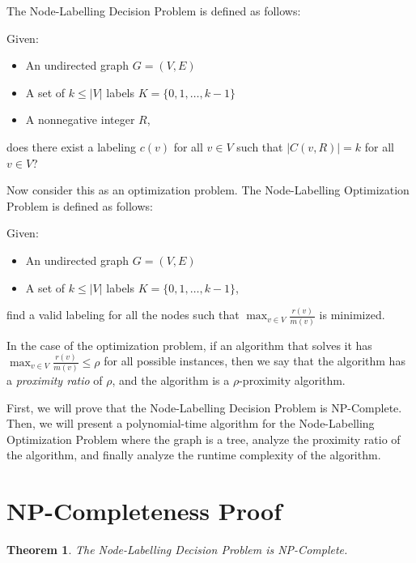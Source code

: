 \documentclass{article}
\newtheorem{theorem}{Theorem}
\begin{document}
\newpage\noindent
The Node-Labelling Decision Problem is defined as follows:

\vspace{1em}\noindent
Given:
\begin{itemize}
    \item An undirected graph $G = (V, E)$
    \item A set of $k \leq |V|$ labels $K = \{0, 1, \ldots, k-1\}$
    \item A nonnegative integer $R$,
\end{itemize}
does there exist a labeling $c(v)$ for all $v \in V$ such that $|C(v, R)| = k$ for all $v \in V$?

\vspace{1em}\noindent
Now consider this as an optimization problem.
The Node-Labelling Optimization Problem is defined as follows:

\vspace{1em}\noindent
Given:
\begin{itemize}
    \item An undirected graph $G = (V, E)$
    \item A set of $k \leq |V|$ labels $K = \{0, 1, \ldots, k-1\}$,
\end{itemize}
find a valid labeling for all the nodes such that $\max_{v \in V} \frac{r(v)}{m(v)}$ is minimized.

\vspace{1em}

In the case of the optimization problem, if an algorithm that solves it has $\max_{v \in V} \frac{r(v)}{m(v)} \leq \rho$ for all possible instances, 
then we say that the algorithm has a \textit{proximity ratio} of $\rho$, and the algorithm is a $\rho$-proximity algorithm.

\vspace{1em}

First, we will prove that the Node-Labelling Decision Problem is NP-Complete.
Then, we will present a polynomial-time algorithm for the Node-Labelling Optimization Problem where the graph is a tree,
analyze the proximity ratio of the algorithm, and finally analyze the runtime complexity of the algorithm.

\section{NP-Completeness Proof}

\begin{theorem}
    The Node-Labelling Decision Problem is NP-Complete.
\end{theorem}
\end{document}
